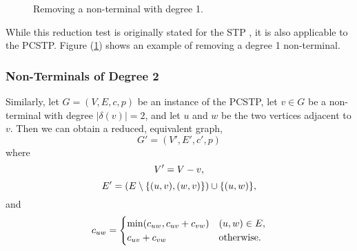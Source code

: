 \begin{figure}[h]\centering
  \caption{Removing a non-terminal with degree 1.}
  \label{fig:red:test:deg1}
\end{figure}

 While this reduction test is originally stated for the STP \citep{hwang1992steiner}, it is also applicable to the PCSTP. Figure (\ref{fig:red:test:deg1})
  shows an example of removing a degree 1 non-terminal.

  \subsubsection{Non-Terminals of Degree 2}
    \label{fig:red:test2}
    Similarly, let $G = (V,E,c,p)$ be an instance of the PCSTP, let $v \in G$ be a non-terminal with degree $|\delta(v)| = 2$, and let
    $u$ and $w$ be the two vertices adjacent to $v$. Then we can obtain a reduced, equivalent graph,
    $$G' = (V', E', c', p)$$
    where
    $$V' = V - v \mathnormal{,}$$
    $$E' = (E \setminus \{(u,v),(w,v)\}) \cup \{(u,w)\}\mathnormal{,}$$
    and
    $$c_{uw} =
    \begin{cases}
      \min(c_{uw}, c_{uv} + c_{vw}) & (u,w) \in E\mathnormal{,} \\
      c_{uv} + c_{vw} & \text{otherwise.}
    \end{cases}$$

